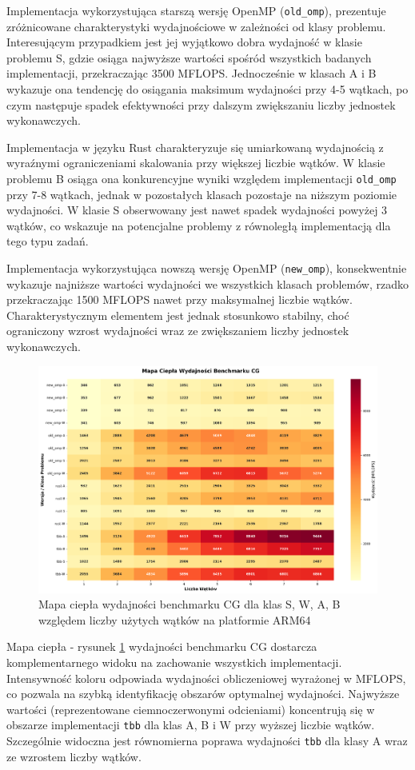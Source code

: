 Implementacja wykorzystująca starszą wersję OpenMP (\texttt{old\_omp}), prezentuje zróżnicowane charakterystyki wydajnościowe w zależności od klasy problemu. Interesującym przypadkiem jest jej wyjątkowo dobra wydajność w klasie problemu S, gdzie osiąga najwyższe wartości spośród wszystkich badanych implementacji, przekraczając 3500 MFLOPS. Jednocześnie w klasach A i B wykazuje ona tendencję do osiągania maksimum wydajności przy 4-5 wątkach, po czym następuje spadek efektywności przy dalszym zwiększaniu liczby jednostek wykonawczych.

Implementacja w języku Rust charakteryzuje się umiarkowaną wydajnością z wyraźnymi ograniczeniami skalowania przy większej liczbie wątków. W klasie problemu B osiąga ona konkurencyjne wyniki względem implementacji \texttt{old\_omp} przy 7-8 wątkach, jednak w pozostałych klasach pozostaje na niższym poziomie wydajności. W klasie S obserwowany jest nawet spadek wydajności powyżej 3 wątków, co wskazuje na potencjalne problemy z równoległą implementacją dla tego typu zadań.

Implementacja wykorzystująca nowszą wersję OpenMP (\texttt{new\_omp}), konsekwentnie wykazuje najniższe wartości wydajności we wszystkich klasach problemów, rzadko przekraczając 1500 MFLOPS nawet przy maksymalnej liczbie wątków. Charakterystycznym elementem jest jednak stosunkowo stabilny, choć ograniczony wzrost wydajności wraz ze zwiększaniem liczby jednostek wykonawczych.

\begin{figure}[H]
    \centering
    \includegraphics[width=\textwidth]{analiza/images/parallel/cg/x86/cg_mapa_ciepla_wydajnosci.png}
    \caption{Mapa ciepła wydajności benchmarku CG dla klas S, W, A, B względem liczby użytych wątków na platformie ARM64}
    \label{cg_heatmap_wydajnosci_x86_64}
\end{figure}
Mapa ciepła - rysunek \ref{cg_heatmap_wydajnosci_x86_64} wydajności benchmarku CG dostarcza komplementarnego widoku na zachowanie wszystkich implementacji. Intensywność koloru odpowiada wydajności obliczeniowej wyrażonej w MFLOPS, co pozwala na szybką identyfikację obszarów optymalnej wydajności. Najwyższe wartości (reprezentowane ciemnoczerwonymi odcieniami) koncentrują się w obszarze implementacji \texttt{tbb} dla klas A, B i W przy wyższej liczbie wątków. Szczególnie widoczna jest równomierna poprawa wydajności \texttt{tbb} dla klasy A wraz ze wzrostem liczby wątków.

